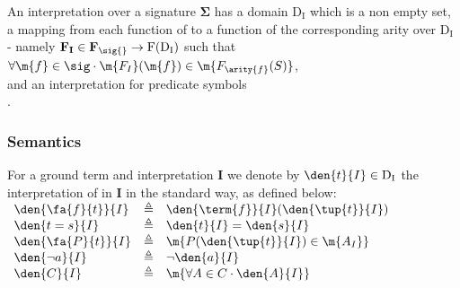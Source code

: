 An interpretation  over a signature $\mathbf{\Sigma}$
has a domain $\mathrm{D_I}$ which is a non empty set,\\
a mapping from each function of \sig{} to a function of the corresponding arity over $\mathrm{D_I}$ -
namely $\mathbf{F_I} \in \mathbf{F_{\sig{}}} \rightarrow \mathrm{F(D_I)}$ such that
$\forall \m{f} \in \mathbf{\sig} \cdot \m{F_I}(\m{f}) \in \m{F_{\arity{f}}(S)}$, \\
and an interpretation for predicate symbols\\
 .

\subsubsection{Semantics}
For a ground term  and interpretation $\mathbf{I}$ we denote by $\den{t}{I} \in \mathrm{D_I}$ the interpretation of  in $\mathbf{I}$ in the standard way, as defined below:\\
$
\begin{array}{lll}

	\den{\fa{f}{t}} {I} & \triangleq & \den{\term{f}}{I}(\den{\tup{t}}{I}) \\
	\den{t=s}       {I} & \triangleq & \den{t}{I}=\den{s}{I}  \\
	\den{\fa{P}{t}} {I} & \triangleq & \m{P(\den{\tup{t}}{I}) \in \m{A_I}} \\
	\den{\lnot a}   {I} & \triangleq & \lnot \den{a}{I} \\
	\den{C}         {I} & \triangleq & \m{\forall A \in C \cdot \den{A}{I}} \\
\end{array}
$

